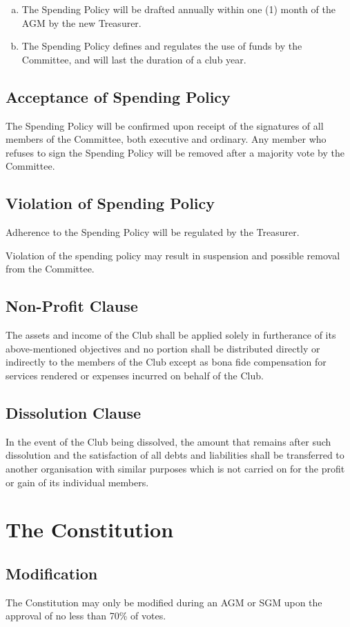 \documentclass[a4paper,12pt]{article}
\begin{document}
\begin{enumerate}[a)]
	\item The Spending Policy will be drafted annually within one (1) month of the AGM by the new Treasurer.
	\item The Spending Policy defines and regulates the use of funds by the Committee, and will last the duration of a club year.
\end{enumerate}

\subsection{Acceptance of Spending Policy}

The Spending Policy will be confirmed upon receipt of the signatures of all members of the Committee, both executive and ordinary. Any member who refuses to sign the Spending Policy will be removed after a majority vote by the Committee.

\subsection{Violation of Spending Policy}

Adherence to the Spending Policy will be regulated by the Treasurer.

Violation of the spending policy may result in suspension and possible removal from the Committee.

\subsection{Non-Profit Clause}

The assets and income of the Club shall be applied solely in furtherance of its above-mentioned objectives and no portion shall be distributed directly or indirectly to the members of the Club except as bona fide compensation for services rendered or expenses incurred on behalf of the Club.

\subsection{Dissolution Clause}

In the event of the Club being dissolved, the amount that remains after such dissolution and the satisfaction of all debts and liabilities shall be transferred to another organisation with similar purposes which is not carried on for the profit or gain of its individual members.

\section{The Constitution}

\subsection{Modification}

The Constitution may only be modified during an AGM or SGM upon the approval of no less than 70\% of votes.
\end{document}
